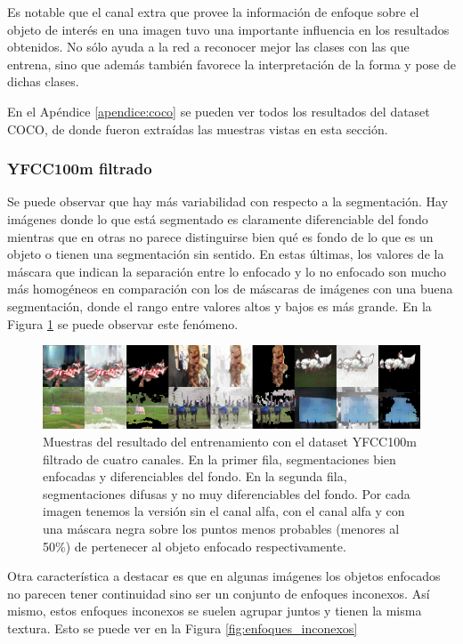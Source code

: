 \documentclass[spanish]{report}
\begin{document}
Es notable que el canal extra que provee la información de enfoque sobre el objeto de interés en una imagen tuvo una importante influencia en los resultados obtenidos. No sólo ayuda a la red a reconocer mejor las clases con las que entrena, sino que además también favorece la interpretación de la forma y pose de dichas clases.

En el Apéndice \ref{apendice:coco} se pueden ver todos los resultados del dataset COCO, de donde fueron extraídas las muestras vistas en esta sección.
 
\subsubsection{YFCC100m filtrado}

Se puede observar que hay más variabilidad con respecto a la segmentación. Hay imágenes donde lo que está segmentado es claramente diferenciable del fondo mientras que en otras no parece distinguirse bien qué es fondo de lo que es un objeto o tienen una segmentación sin sentido. En estas últimas, los valores de la máscara que indican la separación entre lo enfocado y lo no enfocado son mucho más homogéneos en comparación con los de máscaras de imágenes con una buena segmentación, donde el rango entre valores altos y bajos es más grande. En la Figura \ref{fig:resultados_filtrado_segmentacion} se puede observar este fenómeno.

\begin{figure}[H]
\centering
 \includegraphics[width=\linewidth]{resultados_filtrado_segmentacion.png}
   \caption{Muestras del resultado del entrenamiento con el dataset YFCC100m filtrado de cuatro canales. En la primer fila, segmentaciones bien enfocadas y diferenciables del fondo. En la segunda fila, segmentaciones difusas y no muy diferenciables del fondo. Por cada imagen tenemos la versión sin el canal alfa, con el canal alfa y con una máscara negra sobre los puntos menos probables (menores al 50\%) de pertenecer al objeto enfocado respectivamente.}
  \label{fig:resultados_filtrado_segmentacion}
\end{figure}

\noindent Otra característica a destacar es que en algunas imágenes los objetos enfocados no parecen tener continuidad sino ser un conjunto de enfoques inconexos. Así mismo, estos enfoques inconexos se suelen agrupar juntos y tienen la misma textura. Esto se puede ver en la Figura \ref{fig:enfoques_inconexos}
\end{document}

